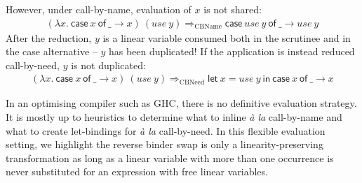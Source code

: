\documentclass[acmsmall,review,anonymous,screen]{acmart}
\newcommand{\llet}[2]{\mathsf{let}~#1~\mathsf{in}~#2}
\newcommand{\ccase}[2]{\mathsf{case}~#1~\mathsf{of}~#2}
\begin{document}
However, under call-by-name, evaluation of $x$ is not shared:
\[
\begin{array}{l}
(\lambda x.~\ccase{x}{\_ \to x})~(use~y)
\Longrightarrow_\textrm{CBName}
\ccase{use~y}{\_ \to use~y}
\end{array}
\]
After the reduction, $y$ is a linear variable consumed both in the scrutinee
and in the case alternative -- $y$ has been duplicated!
%
If the application is instead reduced call-by-need, $y$ is not duplicated:
\[
\begin{array}{l}
(\lambda x.~\ccase{x}{\_ \to x})~(use~y)
\Longrightarrow_\textrm{CBNeed}
\llet{x = use~y}{\ccase{x}{\_ \to x}}
\end{array}
\]

In an optimising compiler such as GHC, there is no definitive evaluation
strategy. It is mostly up to heuristics to determine what to inline
\emph{à la} call-by-name and what to create let-bindings for \emph{à
la} call-by-need.
%
In this flexible evaluation setting, we highlight the reverse binder swap is
only a linearity-preserving transformation as long as a linear variable with
more than one occurrence is never substituted for an expression with free
linear variables.
%
%

%
%
%
%
\end{document}
